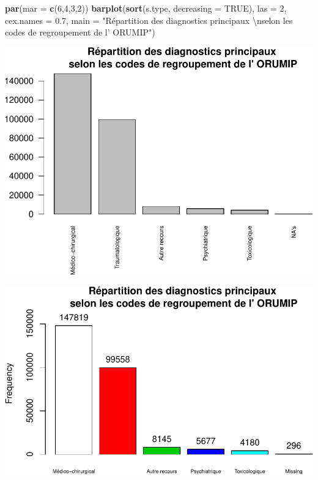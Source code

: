 \documentclass[]{article}
\newenvironment{Shaded}{\begin{snugshade}}{\end{snugshade}}
\newcommand{\KeywordTok}[1]{\textcolor[rgb]{0.13,0.29,0.53}{\textbf{{#1}}}}
\newcommand{\DataTypeTok}[1]{\textcolor[rgb]{0.13,0.29,0.53}{{#1}}}
\newcommand{\DecValTok}[1]{\textcolor[rgb]{0.00,0.00,0.81}{{#1}}}
\newcommand{\FloatTok}[1]{\textcolor[rgb]{0.00,0.00,0.81}{{#1}}}
\newcommand{\CharTok}[1]{\textcolor[rgb]{0.31,0.60,0.02}{{#1}}}
\newcommand{\StringTok}[1]{\textcolor[rgb]{0.31,0.60,0.02}{{#1}}}
\newcommand{\OtherTok}[1]{\textcolor[rgb]{0.56,0.35,0.01}{{#1}}}
\newcommand{\NormalTok}[1]{{#1}}
\begin{document}
\begin{Shaded}
\begin{Highlighting}[]
\KeywordTok{par}\NormalTok{(}\DataTypeTok{mar =} \KeywordTok{c}\NormalTok{(}\DecValTok{6}\NormalTok{,}\DecValTok{4}\NormalTok{,}\DecValTok{3}\NormalTok{,}\DecValTok{2}\NormalTok{))}
\KeywordTok{barplot}\NormalTok{(}\KeywordTok{sort}\NormalTok{(s.type, }\DataTypeTok{decreasing =} \OtherTok{TRUE}\NormalTok{), }\DataTypeTok{las =} \DecValTok{2}\NormalTok{, }\DataTypeTok{cex.names =} \FloatTok{0.7}\NormalTok{, }\DataTypeTok{main =} \StringTok{"Répartition des diagnostics principaux }\CharTok{\textbackslash{}n}\StringTok{selon les codes de regroupement de l' ORUMIP"}\NormalTok{)}
\end{Highlighting}
\end{Shaded}

\includegraphics{analyse_merge_files/figure-latex/type_urgence-2.pdf}

\begin{Shaded}
\end{Shaded}

\includegraphics{analyse_merge_files/figure-latex/type_urgence-3.pdf}
\end{document}
